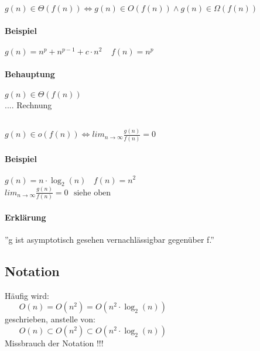 \subsection{}
$g(n) \in \Theta(f(n)) \Leftrightarrow g(n) \in O(f(n)) \land g(n) \in \Omega(f(n))$
\paragraph{Beispiel} $g(n) = n^p + n^{p-1} + c \cdot n^2~~~~~f(n) = n^p$
\paragraph{Behauptung} $g(n) \in \Theta(f(n))$ \\
.... Rechnung

\subsection{}

$g(n) \in o(f(n)) \Leftrightarrow lim_{n \rightarrow \infty} \frac{g(n)}{f(n)} = 0$
\paragraph{Beispiel} $g(n) = n \cdot \log_2(n)~~~~f(n) = n^2$\\
$lim_{n \rightarrow \infty} \frac{g(n)}{f(n)} = 0~~~\text{siehe oben}$\\
\paragraph{Erklärung} ''g ist asymptotisch gesehen vernachlässigbar gegenüber f.''

\pagebreak


\begin{mdframed}
\subsection{Notation}
Häufig wird:\\
$~~~~~~~~O(n) = O(n^2) = O(n^2 \cdot \log_2(n))$ \\
geschrieben, anstelle von:\\
$~~~~~~~~O(n) \subset O(n^2) \subset O(n^2 \cdot \log_2(n))$ \\
Missbrauch der Notation !!!\\

\end{mdframed}


